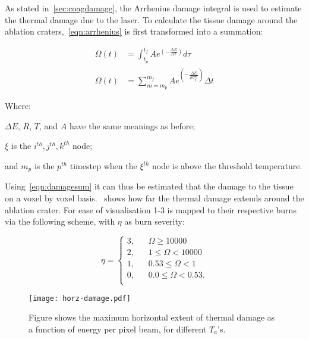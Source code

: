 As stated in~\cref{sec:coagdamage}, the Arrhenius damage integral is used to estimate the thermal damage due to the laser. To calculate the tissue damage around the ablation craters,~\cref{eqn:arrhenius} is first transformed into a summation:

\begin{align}
\Omega(t) &= \int^{t_{f}}_{t_p} Ae^{(-\tfrac{\Delta E}{RT})}d\tau \\
\Omega(t) &= \sum_{m=m_p}^{m_f} Ae^{(-\tfrac{\Delta E}{RT_{\xi}^{m}})}\Delta t\label{eqn:damagesum}
\end{align}
 
\noindent Where: 
	
	\indent $\Delta E$, $R$, $T$, and $A$ have the same meanings as before;
	
	\indent $\xi$ is the $i^{th}, j^{th}, k^{th}$ node;
	
	\indent and $m_p$ is the $p^{th}$ timestep when the $\xi^{th}$ node is above the threshold temperature.

	\medskip
	
	Using~\cref{eqn:damagesum} it can thus be estimated that the damage to the tissue on a voxel by voxel basis.~ shows how far the thermal damage extends around the ablation crater. For ease of visualisation 1-3 is mapped to their respective burns via the following scheme, with $\eta$ as burn severity:
	
\begin{equation}
\eta = 
     \begin{cases}
       \text{3,} &\quad \Omega \geq 10000\\
       \text{2,} &\quad 1 \leq \Omega < 10000\\
       \text{1,} &\quad 0.53 \leq \Omega < 1\\
       \text{0,} &\quad 0.0 \leq \Omega< 0.53.\\
     \end{cases}
\label{eqn:thermalbound}
\end{equation}

\begin{figure}[!htbp]
	\centering
	\texttt{[image: horz-damage.pdf]}
	\caption{Figure shows the maximum horizontal extent of thermal damage as a function of energy per pixel beam, for different $T_a$'s.}
	\label{fig:horz-70}
\end{figure}
	
